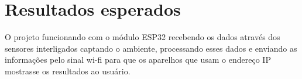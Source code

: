 \chapter{Resultados esperados}
\label{chap:resultados}
O projeto funcionando com o módulo ESP32 recebendo os dados através dos sensores interligados captando o ambiente, processando esses dados e enviando as informações pelo sinal wi-fi para que os aparelhos que usam o endereço IP mostrasse os resultados ao usuário.

